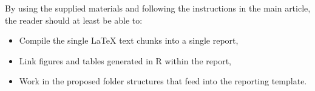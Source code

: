 By using the supplied materials and following the instructions in the main article, the reader should at least be able to: 

  \begin{itemize}
  \item Compile the single \LaTeX{} text chunks into a single report,
  \item Link figures and tables generated in R within the report,
  \item Work in the proposed folder structures that feed into the reporting template.
  \end{itemize}
